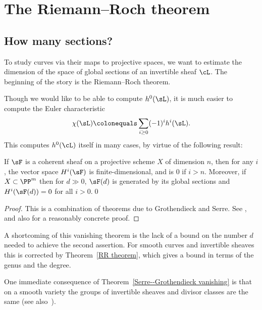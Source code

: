 

\chapter{The Riemann--Roch theorem}\label{RiemannRochChapter}

\section{How many sections?}

To study curves via their maps to projective spaces, we want to estimate the dimension of the space of global
sections of an invertible sheaf $\cL$. The beginning
of the story is the Riemann--Roch theorem.

Though we would like to be able to compute $h^0(\sL)$, it is much
easier to compute the 
Euler characteristic
%
$$
\chi(\sL)\colonequals \sum_{i\geq 0} (-1)^i h^i(\sL).
$$
This computes $h^0(\cL)$ itself in many cases, by virtue of the following result:

\begin{theorem}
\label{Serre--Grothendieck vanishing}
%
%
If $\sF$ is a coherent sheaf on a projective scheme $X$ of dimension $n$, then for any $i$, the vector space $H^i(\sF)$ is finite-dimensional, and is 0 if  $i> n$. Moreover,
if $X\subset \PP^m$ then for $d\gg 0$, $\sF(d)$ is generated by its global sections and $H^i(\sF(d)) = 0$ for all $i>0$.\qed
\end{theorem}

\begin{proof}
This is a combination of 
theorems due to Grothendieck and Serre. See
\cite[Theorems III.2.7 and III.5.2]{Hartshorne1977}, 
and
also \cite{Serre1955} for a 
reasonably
concrete proof.
\end{proof}

A 
shortcoming
of this vanishing theorem is the lack of a bound on the number $d$ needed to achieve the second assertion. For smooth curves
and invertible sheaves
this is corrected by Theorem~\ref{RR theorem}, which gives a bound in terms of the genus and the degree.

One immediate consequence of Theorem~\ref{Serre--Grothendieck vanishing} is that on a smooth variety the groups of invertible sheaves and divisor classes are the same (see also~\cite[Proposition II.6.13]{Hartshorne1977}).

